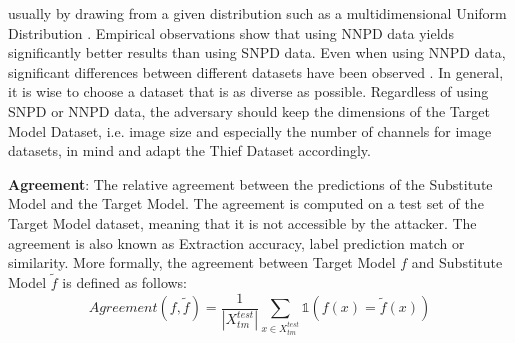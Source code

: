 usually by drawing from a given distribution such as a multidimensional Uniform Distribution \cite{pal2020activethief}. Empirical observations show that using NNPD data
yields significantly better results than using SNPD data. Even when using NNPD data, significant differences between different datasets have been observed 
\cite{pal2020activethief}. In general, it is wise to choose a dataset that is as diverse as possible. Regardless of using SNPD or NNPD data, the adversary should keep the
dimensions of the Target Model Dataset, i.e. image size and especially the number of channels for image datasets, in mind and adapt the Thief Dataset accordingly. \par
\textbf{Agreement}: The relative agreement between the predictions of the Substitute Model and the Target Model. The agreement is computed on a test set of the Target 
Model dataset, meaning that it is not accessible by the attacker. The agreement is also known as Extraction accuracy, label prediction match or similarity. More formally,
the agreement between Target Model $f$ and Substitute Model $\tilde{f}$ is defined as follows:
\begin{equation}
    Agreement(f,\tilde{f}) = \frac{1}{|X_{tm}^{test}|} \sum_{x \in X_{tm}^{test}} \mathds{1}(f(x) = \tilde{f}(x))
\end{equation}




